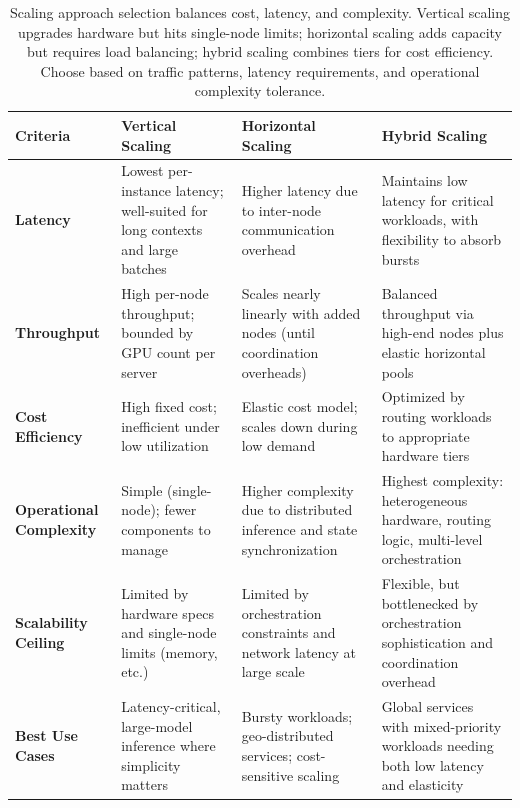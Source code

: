 \begin{table}[t]
\centering
\small
\caption{Scaling approach selection balances cost, latency, and complexity. Vertical scaling upgrades hardware but hits single-node limits; horizontal scaling adds capacity but requires load balancing; hybrid scaling combines tiers for cost efficiency. Choose based on traffic patterns, latency requirements, and operational complexity tolerance.}
\label{tab:ch06_scaling_matrix}
\setlength{\tabcolsep}{6pt}
\renewcommand{\arraystretch}{1.3}
\begin{tabularx}{\linewidth}{@{}>{\raggedright\arraybackslash}p{2.5cm}>{\raggedright\arraybackslash}X>{\raggedright\arraybackslash}X>{\raggedright\arraybackslash}X@{}}
\toprule
\rowcolor{gray!15}
\textbf{Criteria} & \textbf{Vertical Scaling} & \textbf{Horizontal Scaling} & \textbf{Hybrid Scaling} \\
\midrule
\textbf{Latency}
& Lowest per-instance latency; well-suited for long contexts and large batches
& Higher latency due to inter-node communication overhead
& Maintains low latency for critical workloads, with flexibility to absorb bursts \\
\addlinespace[2pt]
\textbf{Throughput}
& High per-node throughput; bounded by GPU count per server
& Scales nearly linearly with added nodes (until coordination overheads)
& Balanced throughput via high-end nodes plus elastic horizontal pools \\
\addlinespace[2pt]
\textbf{Cost Efficiency}
& High fixed cost; inefficient under low utilization
& Elastic cost model; scales down during low demand
& Optimized by routing workloads to appropriate hardware tiers \\
\addlinespace[2pt]
\textbf{Operational Complexity}
& Simple (single-node); fewer components to manage
& Higher complexity due to distributed inference and state synchronization
& Highest complexity: heterogeneous hardware, routing logic, multi-level orchestration \\
\addlinespace[2pt]
\textbf{Scalability Ceiling}
& Limited by hardware specs and single-node limits (memory, etc.)
& Limited by orchestration constraints and network latency at large scale
& Flexible, but bottlenecked by orchestration sophistication and coordination overhead \\
\addlinespace[2pt]
\textbf{Best Use Cases} 
& Latency-critical, large-model inference where simplicity matters 
& Bursty workloads; geo-distributed services; cost-sensitive scaling 
& Global services with mixed-priority workloads needing both low latency and elasticity \\
\bottomrule
\end{tabularx}
\end{table}

